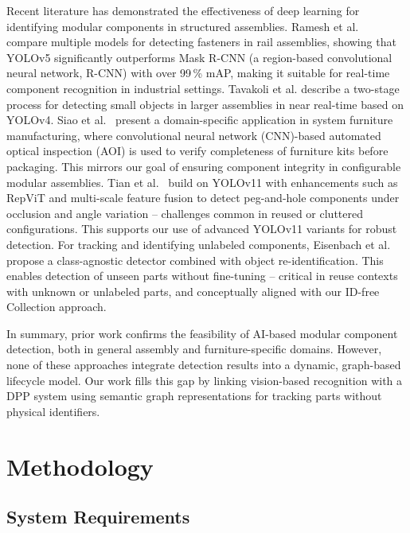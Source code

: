 \documentclass[3p,times,procedia]{elsarticle}
\begin{document}
Recent literature has demonstrated the effectiveness of deep learning for identifying modular components in structured assemblies. Ramesh et al.~\cite{ramesh2024investigation} compare multiple models for detecting fasteners in rail assemblies, showing that YOLOv5 significantly outperforms Mask R-CNN (a region-based convolutional neural network, R-CNN) with over 99\,\% mAP, making it suitable for real-time component recognition in industrial settings. Tavakoli et al. \cite{tavakoli2021small} describe a two-stage process for detecting small objects in larger assemblies in near real-time based on YOLOv4. Siao et al.~\cite{siao2024furniture} present a domain-specific application in system furniture manufacturing, where convolutional neural network (CNN)-based automated optical inspection (AOI) is used to verify completeness of furniture kits before packaging. This mirrors our goal of ensuring component integrity in configurable modular assemblies. Tian et al.~\cite{tian2025Inspection} build on YOLOv11 with enhancements such as RepViT and multi-scale feature fusion to detect peg-and-hole components under occlusion and angle variation -- challenges common in reused or cluttered configurations. This supports our use of advanced YOLOv11 variants for robust detection. For tracking and identifying unlabeled components, Eisenbach et al.~\cite{eisenbach2024detection} propose a class-agnostic detector combined with object re-identification. This enables detection of unseen parts without fine-tuning -- critical in reuse contexts with unknown or unlabeled parts, and conceptually aligned with our ID-free Collection approach.

In summary, prior work confirms the feasibility of AI-based modular component detection, both in general assembly and furniture-specific domains. However, none of these approaches integrate detection results into a dynamic, graph-based lifecycle model. Our work fills this gap by linking vision-based recognition with a DPP system using semantic graph representations for tracking parts without physical identifiers.

\section{Methodology}
\label{sec:method}

\subsection{System Requirements}
\end{document}

